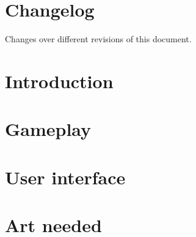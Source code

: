 \documentclass[a4paper, 11pt]{article}
\title{\titlename}
\author{\authorname}
\begin{document}


\tableofcontents
\cleardoublepage

\section{Changelog}
\label{sec:changelog} 

Changes over different revisions of this document.



\section{Introduction}
\label{sec:introduction}
%

\section{Gameplay}
\label{sec:gameplay}
%

\section{User interface}
\label{sec:interface}
%

\section{Art needed}
\label{sec:art}
%
\end{document}
